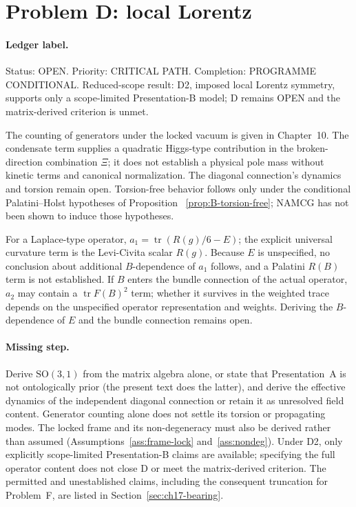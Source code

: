 \section{Problem D: local Lorentz}
\label{sec:status-D}

\paragraph{Ledger label.}
Status: OPEN. Priority: CRITICAL PATH. Completion:
PROGRAMME CONDITIONAL. Reduced-scope result: D2, imposed local
Lorentz symmetry, supports only a scope-limited Presentation-B
model; D remains OPEN and the matrix-derived criterion is unmet.

The counting of generators under the locked vacuum is given in
Chapter~10. The condensate term supplies a quadratic Higgs-type
contribution in the broken-direction combination \(\Xi\); it does not
establish a physical pole mass without kinetic terms and canonical
normalization. The diagonal connection's dynamics and torsion remain
open. Torsion-free behavior follows only under the conditional
Palatini--Holst hypotheses of Proposition~
\ref{prop:B-torsion-free}; NAMCG has not been shown to induce those
hypotheses.

For a Laplace-type operator,
\(a_1=\operatorname{tr}(R(g)/6-E)\); the explicit universal
curvature term is the Levi-Civita scalar \(R(g)\). Because \(E\) is
unspecified, no conclusion about additional \(B\)-dependence of
\(a_1\) follows, and a Palatini \(R(B)\) term is not established. If
\(B\) enters the bundle connection of the actual operator, \(a_2\)
may contain a \(\operatorname{tr}F(B)^2\) term; whether it survives
in the weighted trace depends on the unspecified operator
representation and weights. Deriving the \(B\)-dependence of \(E\)
and the bundle connection remains open.

\paragraph{Missing step.}
Derive \(\mathrm{SO}(3,1)\) from the matrix algebra alone, or state
that Presentation~A is not ontologically prior (the present text
does the latter), and derive the effective dynamics of the
independent diagonal connection or retain it as unresolved field
content. Generator counting alone does not settle its torsion or
propagating modes. The locked frame and its non-degeneracy must also be derived rather
than assumed (Assumptions~\ref{ass:frame-lock} and~\ref{ass:nondeg}).
Under D2, only explicitly scope-limited
Presentation-B claims are available; specifying the full operator
content does not close D or meet the matrix-derived criterion. The
permitted and unestablished claims, including the consequent
truncation for Problem~F, are listed in
Section~\ref{sec:ch17-bearing}.

